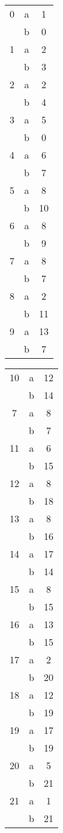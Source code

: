 \documentclass{article}
\begin{document}
    \begin{tabular}{c c c}
    0 & a & 1 \\
        & b & 0 \\
    1 & a & 2 \\
        & b & 3\\
    2 & a & 2\\
        & b & 4\\
    3 & a & 5\\
        & b & 0\\
    4 & a & 6\\
        & b & 7\\
    5 & a & 8\\
        & b & 10\\
    6 & a & 8\\
        & b & 9\\
    7 & a & 8\\
        & b & 7\\
    8 & a & 2\\
        & b & 11\\
    9 & a & 13\\
        & b & 7\\
    \end{tabular}
    \quad
    \begin{tabular}{c c c}
    10 & a & 12 \\
        & b & 14\\
    7 & a & 8\\
        & b & 7\\
    11 & a & 6\\
        & b & 15\\
    12 & a & 8\\
        & b & 18\\
    13 & a & 8\\
     & b & 16\\
    14 & a & 17\\
        & b & 14\\
    15 & a & 8\\
        & b & 15\\
    16 & a & 13\\
        & b & 15\\
    17 & a & 2\\
        & b & 20\\
    18 & a & 12\\
        & b & 19\\
    19 & a & 17\\
        & b & 19\\
    20 & a & 5\\
        & b & 21\\
    21 & a & 1\\
        & b & 21\\
    \end{tabular}
\end{document}
